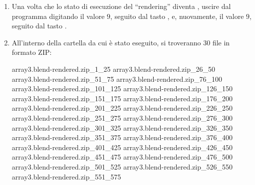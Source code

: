\begin{enumerate}
\begin{figure}
\caption{Monitor dello stato di esecuzione del ``rendering'' di ogni gruppo di ``frame''.}
\label{fig:monitor-arraydemo}
\end{figure}
\item \label{lbl:exec-array3-postrenderstep1} Una volta che lo stato di esecuzione del ``rendering'' diventa , uscire dal programma digitando il valore $9$, seguito dal tasto , e, nuovamente, il valore $9$, seguito dal tasto .
\item \label{lbl:exec-array3-postrenderstep2} All'interno della cartella da cui \mgTheApp{} \`e stato eseguito, si troveranno $30$ file in formato ZIP:
\begin{mgCodeBox}
\small
array3.blend-rendered.zip\_1\_25\newline
array3.blend-rendered.zip\_26\_50\newline
array3.blend-rendered.zip\_51\_75\newline
array3.blend-rendered.zip\_76\_100\newline
array3.blend-rendered.zip\_101\_125\newline
array3.blend-rendered.zip\_126\_150\newline
array3.blend-rendered.zip\_151\_175\newline
array3.blend-rendered.zip\_176\_200\newline
array3.blend-rendered.zip\_201\_225\newline
array3.blend-rendered.zip\_226\_250\newline
array3.blend-rendered.zip\_251\_275\newline
array3.blend-rendered.zip\_276\_300\newline
array3.blend-rendered.zip\_301\_325\newline
array3.blend-rendered.zip\_326\_350\newline
array3.blend-rendered.zip\_351\_375\newline
array3.blend-rendered.zip\_376\_400\newline
array3.blend-rendered.zip\_401\_425\newline
array3.blend-rendered.zip\_426\_450\newline
array3.blend-rendered.zip\_451\_475\newline
array3.blend-rendered.zip\_476\_500\newline
array3.blend-rendered.zip\_501\_525\newline
array3.blend-rendered.zip\_526\_550\newline
array3.blend-rendered.zip\_551\_575\newline

\end{mgCodeBox}
\end{enumerate}
